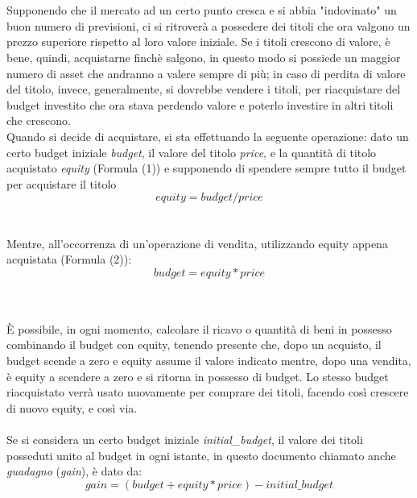 \documentclass[a4paper,12pt]{report}
\begin{document}
\\~\\
Supponendo che il mercato ad un certo punto cresca e si abbia "indovinato" un buon numero di previsioni, ci si ritroverà a possedere dei titoli che ora valgono un prezzo superiore rispetto al loro valore iniziale. Se i titoli crescono di valore, è bene, quindi, acquistarne finchè salgono, in questo modo si possiede un maggior numero di asset che andranno a valere sempre di più; in caso di perdita di valore del titolo, invece, generalmente, si dovrebbe vendere i titoli, per riacquistare del budget investito che ora stava perdendo valore e poterlo investire in altri titoli che crescono.\\
Quando si decide di acquistare, si sta effettuando la seguente operazione: dato un certo budget iniziale \textit{budget}, il valore del titolo \textit{price}, e la quantità di titolo acquistato \textit{equity} (Formula (1)) e supponendo di spendere sempre tutto il budget per acquistare il titolo
\\

\begin{equation}
equity=budget/price
\end{equation}
\\~\\
Mentre, all'occorrenza di un'operazione di vendita, utilizzando equity appena acquistata (Formula (2)):\\

\begin{equation}
budget=equity*price
\end{equation}

\\~\\
È possibile, in ogni momento, calcolare il ricavo o quantità di beni in possesso combinando il budget con equity, tenendo presente che, dopo un acquisto, il budget scende a zero e equity assume il valore indicato mentre, dopo una vendita, è equity a scendere a zero e si ritorna in possesso di budget. Lo stesso budget riacquistato verrà usato nuovamente per comprare dei titoli, facendo così crescere di nuovo equity, e così via.
\\~\\ 
Se si considera un certo budget iniziale \textit{initial\_budget}, il valore dei titoli posseduti unito al budget in ogni istante, in questo documento chiamato anche \textit{guadagno} (\textit{gain}), è dato da:
\\
\begin{equation}
gain=(budget+equity*price)-initial\_budget
\end{equation}
\end{document}
